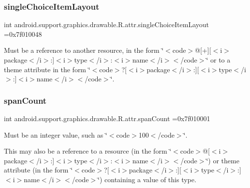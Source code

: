 \subsubsection{\texorpdfstring{single\+Choice\+Item\+Layout}{singleChoiceItemLayout}}
{\footnotesize\ttfamily int android.\+support.\+graphics.\+drawable.\+R.\+attr.\+single\+Choice\+Item\+Layout =0x7f010048\hspace{0.3cm}{\ttfamily [static]}}

Must be a reference to another resource, in the form \char`\"{}$<$code$>$@\mbox{[}+\mbox{]}\mbox{[}$<$i$>$package$<$/i$>$\+:\mbox{]}$<$i$>$type$<$/i$>$\+:$<$i$>$name$<$/i$>$$<$/code$>$\char`\"{} or to a theme attribute in the form \char`\"{}$<$code$>$?\mbox{[}$<$i$>$package$<$/i$>$\+:\mbox{]}\mbox{[}$<$i$>$type$<$/i$>$\+:\mbox{]}$<$i$>$name$<$/i$>$$<$/code$>$\char`\"{}. \mbox{\label{classandroid_1_1support_1_1graphics_1_1drawable_1_1R_1_1attr_a69614a743b7f2f61bc79c2124cac8b1e}} 
\subsubsection{\texorpdfstring{span\+Count}{spanCount}}
{\footnotesize\ttfamily int android.\+support.\+graphics.\+drawable.\+R.\+attr.\+span\+Count =0x7f010001\hspace{0.3cm}{\ttfamily [static]}}

Must be an integer value, such as \char`\"{}$<$code$>$100$<$/code$>$\char`\"{}. 

This may also be a reference to a resource (in the form \char`\"{}$<$code$>$@\mbox{[}$<$i$>$package$<$/i$>$\+:\mbox{]}$<$i$>$type$<$/i$>$\+:$<$i$>$name$<$/i$>$$<$/code$>$\char`\"{}) or theme attribute (in the form \char`\"{}$<$code$>$?\mbox{[}$<$i$>$package$<$/i$>$\+:\mbox{]}\mbox{[}$<$i$>$type$<$/i$>$\+:\mbox{]}$<$i$>$name$<$/i$>$$<$/code$>$\char`\"{}) containing a value of this type. \mbox{\label{classandroid_1_1support_1_1graphics_1_1drawable_1_1R_1_1attr_a0bbb8c2047c21baf83647e028df410b9}} 
